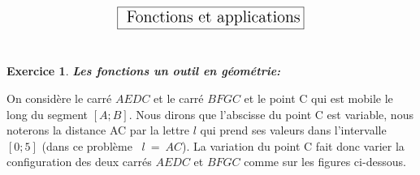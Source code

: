 \documentclass[a4paper,10pt]{article}
\theoremstyle{definition}
\theoremstyle{definition}
\newtheorem*{exo}{Exercice}
\begin{document}
\lhead{}\chead{}\rhead{}\renewcommand{\headrulewidth}{0pt}\renewcommand{\footrulewidth}{0.4pt}


$$\fbox{\text{\Large{ Fonctions et applications}}}$$
\hfil\\

\begin{exo}\textit{\textbf{Les fonctions un outil en géométrie:}}\\
	
\par On considère le carré $AEDC$ et le carré $BFGC$ et 
le point C qui est mobile le long du segment $[A;B]$. Nous dirons que l'abscisse du point C est variable, nous noterons la distance AC par la lettre $l$ qui prend ses valeurs dans l'intervalle $[0;5]$ (dans ce problème ~$l\ = \ AC$). La variation du point C fait donc varier la configuration des deux carrés $AEDC$ et $BFGC$ comme sur les figures ci-dessous.\\


\end{exo}
\end{document}
